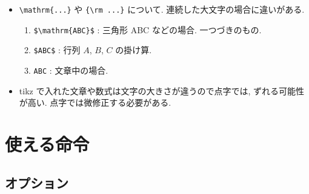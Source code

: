\documentclass[lualatex,ja=standard,jafont=haranoaji]{bxjsarticle}
\def\eg{\par\emph{例} :  }
\begin{document}
\begin{itemize}
  \eg 数式番号として (*) を使うと,
  \begin{enumerate}
  \item \verb|$(*)$|
  \item \verb|(*)|
  \end{enumerate}
  は全く別物になってしまう. 使うのであれば (2) を使うこと.
  
  \eg メールアドレスは \verb|\texttt{komori@rikkyo.ac.jp}| などのように書くこと. \\
  (\verb|\begin{verbatim}...\end{verbatim}|, \verb|\verb|, \verb|\texttt|, \verb|\tt| は (プログラムのソースなどの) 情報モードになる.)

  \eg (正しい) \texttt{komori@rikkyo.ac.jp}

  \eg (正しくない) komori@rikkyo.ac.jp


\eg 証明終了は \verb|\qed| という記号があるので, それを使うこと.

\eg 矢印 \verb|$\rightarrow$| などは, 単独であれば, 自動的に文章中の矢印に変換されるので, これは使っても良い.

\item \verb|\mathrm{...}| や \verb|{\rm ...}| について. 連続した大文字の場合に違いがある.
  \begin{enumerate}
  \item \verb|$\mathrm{ABC}$| : 三角形 ABC などの場合. 一つづきのもの.
  \item \verb|$ABC$| : 行列 $A$, $B$, $C$ の掛け算.
  \item \verb|ABC| : 文章中の場合.
  \end{enumerate}
  
\item tikz で入れた文章や数式は文字の大きさが違うので点字では, ずれる可能性が高い. 点字では微修正する必要がある.

\end{itemize}

\section{使える命令}

\subsection{オプション}
\end{document}
